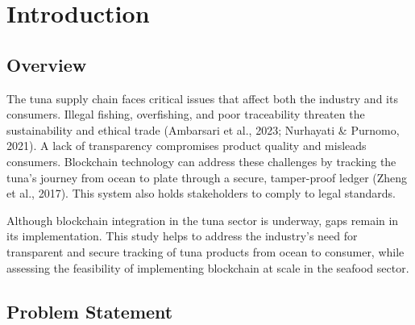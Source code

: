 \chapter{Introduction}
\label{sec:researchdesc}    %
\vspace*{-1cm}  %
\section{Overview}
\label{sec:overview}
The tuna supply chain faces critical issues that affect both the industry and its consumers. Illegal fishing, overfishing, and poor traceability threaten the sustainability and ethical trade (Ambarsari et al., 2023; Nurhayati \& Purnomo, 2021)\nocite{intro-1}\nocite{intro-2}. A lack of transparency compromises product quality and misleads consumers. Blockchain technology can address these challenges by tracking the tuna's journey from ocean to plate through a secure, tamper-proof ledger (Zheng et al., 2017)\nocite{rrl-ToB1}. This system also holds stakeholders to comply to legal standards.

\noindent Although blockchain integration in the tuna sector is underway, gaps remain in its implementation. This study helps to address the industry’s need for transparent and secure tracking of tuna products from ocean to consumer, while assessing the feasibility of implementing blockchain at scale in the seafood sector.


\section{Problem Statement}

